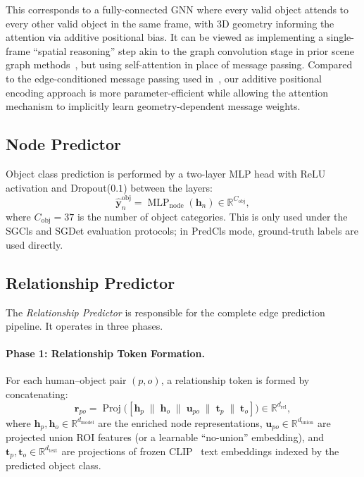 \documentclass[runningheads]{llncs}
\newcommand{\mR}{\mathbb{R}}
\newcommand{\op}[1]{\operatorname{#1}}
\newcommand{\mat}[1]{\bm{#1}}
\begin{document}
This corresponds to a fully-connected GNN where every valid object attends to every other valid object in the same frame, with 3D geometry informing the attention via additive positional bias.  It can be viewed as implementing a single-frame ``spatial reasoning'' step akin to the graph convolution stage in prior scene graph methods~\cite{xu2017scene,yang2018graph,li2018factorizable}, but using self-attention in place of message passing.  Compared to the edge-conditioned message passing used in~\cite{yang2018graph}, our additive positional encoding approach is more parameter-efficient while allowing the attention mechanism to implicitly learn geometry-dependent message weights.


\subsection{Node Predictor}
\label{sec:node_predictor}

Object class prediction is performed by a two-layer MLP head with ReLU activation and Dropout($0.1$) between the layers:
\begin{equation}
    \hat{\mat{y}}_n^{\text{obj}} = \op{MLP}_{\text{node}}(\mat{h}_n) \in \mR^{C_{\text{obj}}},
    \label{eq:node_pred}
\end{equation}
where $C_{\text{obj}}=37$ is the number of object categories.  This is only used under the SGCls and SGDet evaluation protocols; in PredCls mode, ground-truth labels are used directly.


\subsection{Relationship Predictor}
\label{sec:rel_pred}

The \emph{Relationship Predictor} is responsible for the complete edge prediction pipeline.  It operates in three phases.

\paragraph{Phase 1: Relationship Token Formation.}
For each human--object pair $(p, o)$, a relationship token is formed by concatenating:
\begin{equation}
    \mat{r}_{po} = \op{Proj}\bigl([\mat{h}_p \;\|\; \mat{h}_o \;\|\; \mat{u}_{po} \;\|\; \mat{t}_p \;\|\; \mat{t}_o]\bigr) \in \mR^{d_{\text{rel}}},
    \label{eq:rel_token}
\end{equation}
where $\mat{h}_p, \mat{h}_o \in \mR^{d_{\text{model}}}$ are the enriched node representations, $\mat{u}_{po} \in \mR^{d_{\text{union}}}$ are projected union ROI features (or a learnable ``no-union'' embedding), and $\mat{t}_p, \mat{t}_o \in \mR^{d_{\text{text}}}$ are projections of frozen CLIP~\cite{radford2021learning} text embeddings indexed by the predicted object class.
\end{document}
